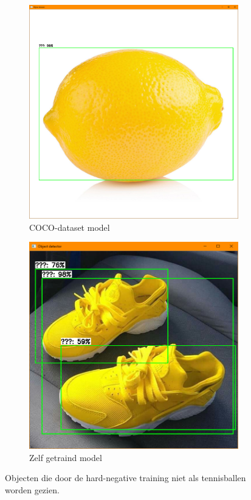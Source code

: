 \begin{figure}[H]
    \begin{subfigure}{0.5\textwidth}
        \includegraphics[width=0.9\linewidth]{img/hard_negative_white.png} 
        \caption{COCO-dataset model}
        \label{fig:hard-negative-white}
    \end{subfigure}
    \begin{subfigure}{0.5\textwidth}
        \includegraphics[width=0.9\linewidth]{img/hard_negative_shoes.png}
        \caption{Zelf getraind model}
        \label{fig:hard-negative-shoes}
    \end{subfigure}
    \caption{Objecten die door de hard-negative training niet als tennisballen worden gezien.}
    \label{fig:model-hard-negative}
\end{figure}

